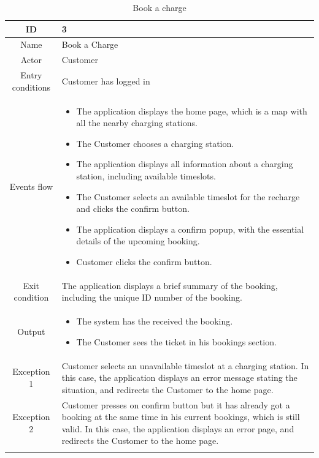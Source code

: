 \begin{longtable}{|c| p{10cm}|}
    \hline ID        & 3\\
    \hline
    Name     & Book a Charge \\
    \hline
    Actor            & Customer\\
    \hline
    Entry conditions & Customer has logged in \\
    \hline
    Events flow      & \begin{itemize}[nosep,after=\strut]
        \item The application displays the home page, which is a map with all the nearby charging stations.
        \item The Customer chooses a charging station.
        \item The application displays all information about a charging station, including available timeslots.
        \item The Customer selects an available timeslot for the recharge and clicks the confirm button.
        \item The application displays a confirm popup, with the essential details of the upcoming booking.
        \item Customer clicks the confirm button.
    \end{itemize}\\
    \hline
    Exit condition   & The application displays a brief summary of the booking, including the unique ID number of the booking.\\
    \hline
    Output           & \begin{itemize}
        \item   The system has the received the booking.
        \item   The Customer sees the ticket in his bookings section.
    \end{itemize}\\
    \hline
    \hline
    Exception 1      &  Customer selects an unavailable timeslot at a charging station. In this case, the application displays an error message stating the situation, and redirects the Customer to the home page. \\
    \hline
    Exception 2      & Customer presses on confirm button but it has already got a booking at the same time in his current bookings, which is still valid. In this case, the application displays an error page, and redirects the Customer to the home page.       \\
    \hline
    \caption{Book a charge}\\
\end{longtable}
